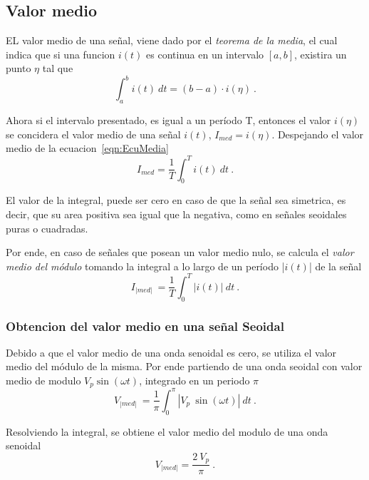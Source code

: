 \subsection{Valor medio}
    EL valor medio de una señal, viene dado por el 
    \textit{teorema de la media}, el cual indica que si una funcion \(i(t)\)
    es continua en un intervalo \([a,b]\), existira un punto \(\eta\) 
    tal que
    \begin{equation}
        \int_{a}^{b} i(t)~dt = (b-a)\cdot i(\eta)~. \label{eqn:EcuMedia}
    \end{equation}

    \noindent Ahora si el intervalo presentado, es igual a un período T, entonces 
    el valor \(i(\eta)\) se concidera el valor medio de una señal \(i(t)\), 
    \(I_{med} = i(\eta)\). Despejando el valor medio de la ecuacion~\ref{eqn:EcuMedia}
    \begin{equation*}
        I_{med}= \dfrac{1}{T}\int_{0}^{T} i(t)~dt~.
    \end{equation*}

    El valor de la integral, puede ser cero en caso de que la señal sea simetrica, es decir,
    que su area positiva sea igual que la negativa, como en señales seoidales puras o 
    cuadradas.
    
    \noindent Por ende, en caso de señales que posean un valor medio nulo, se calcula el
    \textit{valor medio del módulo} tomando la integral a lo largo de un período 
    |\(i(t)\)| de la señal
    \begin{equation*}
        I_{|med|} ~ = \dfrac{1}{T} \int_{0}^{T} |i(t)|~dt~.
    \end{equation*}

        \subsubsection{Obtencion del valor medio en una señal Seoidal}

            Debido a que el valor medio de una onda senoidal es cero, se utiliza el 
            valor medio del módulo de la misma. Por ende partiendo de una onda seoidal
            con valor medio de modulo \(V_p\sin(\omega t)\), integrado en un periodo \(\pi\)
            \begin{equation*}
                V_{|med|} ~ = \dfrac{1}{\pi} \int_{0}^{\pi} |V_p~\sin(\omega t)|~dt~.
            \end{equation*}

            \noindent Resolviendo la integral, se obtiene el valor medio del modulo de una 
            onda senoidal 
            \begin{equation*}
                V_{|med|} = \dfrac{2~V_p}{\pi}~.
            \end{equation*}
            
